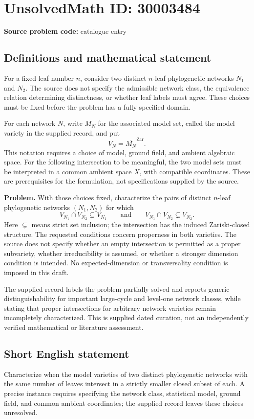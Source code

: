 \documentclass[11pt]{article}
\begin{document}
\section*{UnsolvedMath ID: 30003484}
\textbf{Source problem code:} catalogue entry
\subsection{Definitions and mathematical statement}
For a fixed leaf number \(n\), consider two distinct \(n\)-leaf phylogenetic networks \(N_1\) and \(N_2\). The source does not specify the admissible network class, the equivalence relation determining distinctness, or whether leaf labels must agree. These choices must be fixed before the problem has a fully specified domain.

For each network \(N\), write \(M_N\) for the associated model set, called the model variety in the supplied record, and put
\[
V_N=\overline{M_N}^{\mathrm{Zar}}.
\]
This notation requires a choice of model, ground field, and ambient algebraic space. For the following intersection to be meaningful, the two model sets must be interpreted in a common ambient space \(X\), with compatible coordinates. These are prerequisites for the formulation, not specifications supplied by the source.

\textbf{Problem.} With those choices fixed, characterize the pairs of distinct \(n\)-leaf phylogenetic networks \((N_1,N_2)\) for which
\[
V_{N_1}\cap V_{N_2}\subsetneq V_{N_1}
\qquad\text{and}\qquad
V_{N_1}\cap V_{N_2}\subsetneq V_{N_2}.
\]
Here \(\subsetneq\) means strict set inclusion; the intersection has the induced Zariski-closed structure. The requested conditions concern properness in both varieties. The source does not specify whether an empty intersection is permitted as a proper subvariety, whether irreducibility is assumed, or whether a stronger dimension condition is intended. No expected-dimension or transversality condition is imposed in this draft.

The supplied record labels the problem partially solved and reports generic distinguishability for important large-cycle and level-one network classes, while stating that proper intersections for arbitrary network varieties remain incompletely characterized. This is supplied dated curation, not an independently verified mathematical or literature assessment.
\subsection{Short English statement}
Characterize when the model varieties of two distinct phylogenetic networks with the same number of leaves intersect in a strictly smaller closed subset of each. A precise instance requires specifying the network class, statistical model, ground field, and common ambient coordinates; the supplied record leaves these choices unresolved.
\end{document}
